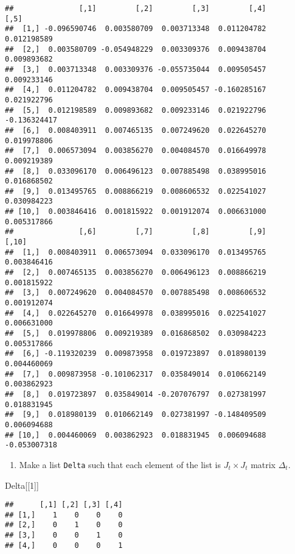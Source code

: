 \documentclass[
]{book}
\newenvironment{Shaded}{\begin{snugshade}}{\end{snugshade}}
\newcommand{\DecValTok}[1]{\textcolor[rgb]{0.00,0.00,0.81}{#1}}
\newcommand{\NormalTok}[1]{#1}
\providecommand{\tightlist}{%
  \setlength{\itemsep}{0pt}\setlength{\parskip}{0pt}}
\begin{document}
\begin{verbatim}
##               [,1]         [,2]         [,3]         [,4]         [,5]
##  [1,] -0.096590746  0.003580709  0.003713348  0.011204782  0.012198589
##  [2,]  0.003580709 -0.054948229  0.003309376  0.009438704  0.009893682
##  [3,]  0.003713348  0.003309376 -0.055735044  0.009505457  0.009233146
##  [4,]  0.011204782  0.009438704  0.009505457 -0.160285167  0.021922796
##  [5,]  0.012198589  0.009893682  0.009233146  0.021922796 -0.136324417
##  [6,]  0.008403911  0.007465135  0.007249620  0.022645270  0.019978806
##  [7,]  0.006573094  0.003856270  0.004084570  0.016649978  0.009219389
##  [8,]  0.033096170  0.006496123  0.007885498  0.038995016  0.016868502
##  [9,]  0.013495765  0.008866219  0.008606532  0.022541027  0.030984223
## [10,]  0.003846416  0.001815922  0.001912074  0.006631000  0.005317866
##               [,6]         [,7]         [,8]         [,9]        [,10]
##  [1,]  0.008403911  0.006573094  0.033096170  0.013495765  0.003846416
##  [2,]  0.007465135  0.003856270  0.006496123  0.008866219  0.001815922
##  [3,]  0.007249620  0.004084570  0.007885498  0.008606532  0.001912074
##  [4,]  0.022645270  0.016649978  0.038995016  0.022541027  0.006631000
##  [5,]  0.019978806  0.009219389  0.016868502  0.030984223  0.005317866
##  [6,] -0.119320239  0.009873958  0.019723897  0.018980139  0.004460069
##  [7,]  0.009873958 -0.101062317  0.035849014  0.010662149  0.003862923
##  [8,]  0.019723897  0.035849014 -0.207076797  0.027381997  0.018831945
##  [9,]  0.018980139  0.010662149  0.027381997 -0.148409509  0.006094688
## [10,]  0.004460069  0.003862923  0.018831945  0.006094688 -0.053007318
\end{verbatim}

\begin{enumerate}
\def\labelenumi{\arabic{enumi}.}
\setcounter{enumi}{5}
\tightlist
\item
  Make a list \texttt{Delta} such that each element of the list is \(J_t \times J_t\) matrix \(\Delta_t\).
\end{enumerate}

\begin{Shaded}
\begin{Highlighting}[]
\NormalTok{Delta[[}\DecValTok{1}\NormalTok{]]}
\end{Highlighting}
\end{Shaded}

\begin{verbatim}
##      [,1] [,2] [,3] [,4]
## [1,]    1    0    0    0
## [2,]    0    1    0    0
## [3,]    0    0    1    0
## [4,]    0    0    0    1
\end{verbatim}
\end{document}
